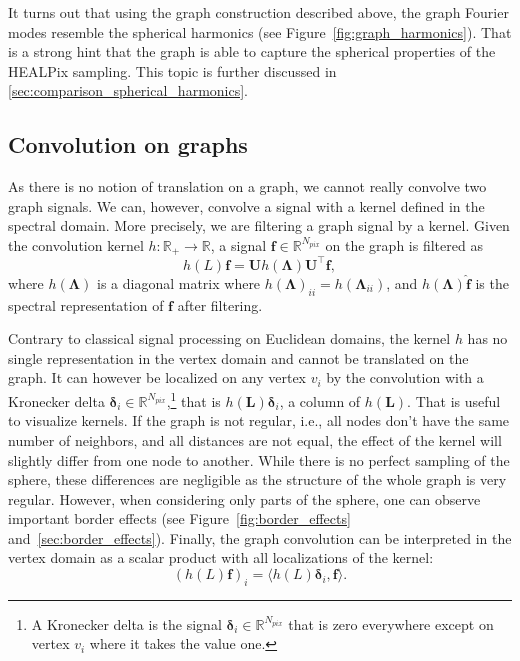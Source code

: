 \documentclass[final,twocolumn,3p,times,authoryear]{elsarticle}
\newcommand{\todo}[1]{{\color[rgb]{.6,.1,.6}{#1}}}
\newcommand{\figref}[1]{Figure~\ref{fig:#1}}
\renewcommand{\b}[1]{{\bm{#1}}}   %
\newcommand{\1}{\b{1}}              %
\newcommand{\0}{\b{0}}              %
\renewcommand{\L}{\b{L}}
\newcommand{\U}{\b{U}}
\newcommand{\f}{\b{f}}
\newcommand{\trans}{^\intercal}
\newcommand{\R}{\mathbb{R}}
\newcommand{\bLambda}{\b{\Lambda}}
\begin{document}
It turns out that using the graph construction described above, the graph Fourier modes resemble the spherical harmonics (see \figref{graph_harmonics}). That is a strong hint that the graph is able to capture the spherical properties of the HEALPix sampling. This topic is further discussed in \ref{sec:comparison_spherical_harmonics}.

\subsection{Convolution on graphs}
\label{sec:graph_convolution}

As there is no notion of translation on a graph, we cannot really convolve two graph signals. We can, however, convolve a signal with a kernel defined in the spectral domain. More precisely, we are filtering a graph signal by a kernel. Given the convolution kernel
$h: \R_+ \rightarrow \R$, a signal $\f \in \R^{N_{pix}}$ on the graph is filtered as
\begin{equation} \label{eqn:graph_convolution}
	h(L) \f = \U h(\bLambda) \U\trans \f,
\end{equation}
where $h(\bLambda)$ is a diagonal matrix where $h(\bLambda)_{ii} = h(\bLambda_{ii})$, and $h(\bLambda) \hat{\f}$ is the spectral representation of $\f$ after filtering.

Contrary to classical signal processing on Euclidean domains, the kernel $h$ has no single representation in the vertex domain and cannot be translated on the graph. It can however be localized on any vertex $v_i$ by the convolution with a Kronecker delta $\b \delta_i \in \R^{N_{pix}}$,\footnote{A Kronecker delta is the signal $\b \delta_i \in \R^{N_{pix}}$ that is zero everywhere except on vertex $v_i$ where it takes the value one.} that is $h(\L) \b \delta_i$, a column of $h(\L)$.
That is useful to visualize kernels. \todo{nath: link with appendix}
If the graph is not regular, i.e., all nodes don't have the same number of neighbors, and all distances are not equal, the effect of the kernel will slightly differ from one node to another. While there is no perfect sampling of the sphere, these differences are negligible as the structure of the whole graph is very regular. However, when considering only parts of the sphere, one can observe important border effects (see \figref{border_effects} and~\ref{sec:border_effects}).
Finally, the graph convolution can be interpreted in the vertex domain as a scalar product with all localizations of the kernel:
\begin{equation} \label{eqn:graph_convolution_spatial}
	(h(L) \f)_i = \langle h(L) \b \delta_i, \f \rangle.
\end{equation}
\end{document}
